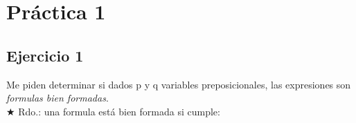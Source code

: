 
\usepackage{caratula}
\usepackage{enumerate}
\usepackage{hyperref}
\usepackage{graphicx}
\usepackage{amsfonts}
\usepackage{enumitem}

\decimalpoint
\hypersetup{colorlinks=true, linkcolor=black, urlcolor=blue}
\setlength{\parindent}{0em}
\setlength{\parskip}{0.5em}
\setcounter{tocdepth}{2} %
\setcounter{section}{0} %
\renewcommand{\thesubsubsection}{\thesubsection.\Alph{subsubsection}}
\graphicspath{ {images/} }



	
	
	\maketitle
	\newpage
	
	\tableofcontents
	\newpage
	
	\section{Práctica 1}
	
	\subsection{Ejercicio 1}
	
	Me piden determinar si dados p y q variables preposicionales, las expresiones son \emph{formulas bien formadas}.\\
	$\bigstar$ Rdo.: una formula está bien formada si cumple: 
	
	
